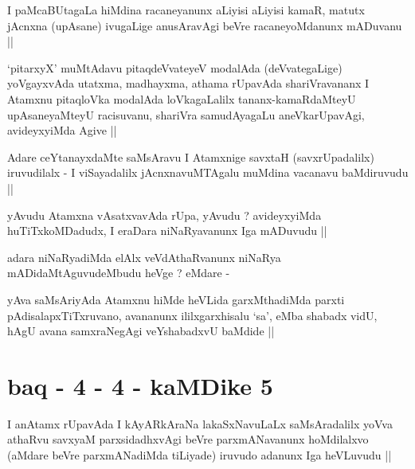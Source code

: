 \begin{artha}
I paMcaBUtagaLa hiMdina racaneyanunx aLiyisi aLiyisi kamaR, matutx
jAcnxna (upAsane) ivugaLige anusAravAgi beVre racaneyoMdanunx mADuvanu ||
\end{artha}


\begin{artha}
`pitarxyX' muMtAdavu pitaqdeVvateyeV modalAda (deVvategaLige)
  yoVgayxvAda utatxma, madhayxma, athama rUpavAda shariVravananx I
  Atamxnu pitaqloVka modalAda loVkagaLalilx tananx-kamaRdaMteyU
  upAsaneyaMteyU racisuvanu, shariVra samudAyagaLu aneVkarUpavAgi,
  avideyxyiMda Agive ||
\end{artha}

\begin{artha}
Adare ceYtanayxdaMte saMsAravu I Atamxnige savxtaH (savxrUpadalilx)
iruvudilalx - I viSayadalilx jAcnxnavuMTAgalu muMdina vacanavu
baMdiruvudu ||
\end{artha}

\begin{artha}
yAvudu Atamxna vAsatxvavAda rUpa, yAvudu ? avideyxyiMda
huTiTxkoMDadudx, I eraDara niNaRyavanunx Iga mADuvudu ||
\end{artha}

\begin{artha}
adara niNaRyadiMda elAlx veVdAthaRvanunx niNaRya mADidaMtAguvudeMbudu
heVge ? eMdare -
\end{artha}

\begin{artha}
yAva saMsAriyAda Atamxnu hiMde heVLida garxMthadiMda parxti
pAdisalapxTiTxruvano, avananunx ililxgarxhisalu `sa', eMba shabadx
vidU, hAgU avana samxraNegAgi veYshabadxvU baMdide ||
\end{artha}

\section*{baq - 4 - 4 - kaMDike 5}

\stext

\begin{artha}
I anAtamx rUpavAda I kAyARkAraNa lakaSxNavuLaLx saMsAradalilx yoVva
athaRvu savxyaM parxsidadhxvAgi beVre parxmANavanunx hoMdilalxvo
(aMdare beVre parxmANadiMda tiLiyade) iruvudo adanunx Iga heVLuvudu ||
\end{artha}


